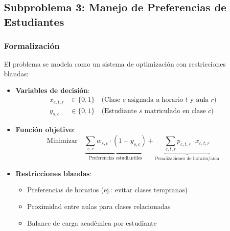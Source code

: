 \documentclass[12pt, a4paper]{article}
\begin{document}
\subsection{Subproblema 3: Manejo de Preferencias de Estudiantes}

\subsubsection*{Formalización}
El problema se modela como un sistema de optimización con restricciones blandas:

\begin{itemize}
    \item \textbf{Variables de decisión}:
    \begin{align*}
        x_{c,t,r} &\in \{0, 1\} \quad \text{(Clase $c$ asignada a horario $t$ y aula $r$)} \\
        y_{s,c} &\in \{0, 1\} \quad \text{(Estudiante $s$ matriculado en clase $c$)}
    \end{align*}
    
    \item \textbf{Función objetivo}:
    \[
    \text{Minimizar} \quad \underbrace{\sum_{s,c} w_{s,c} \cdot (1 - y_{s,c})}_{\text{Preferencias estudiantiles}} + \underbrace{\sum_{c,t,r} p_{c,t,r} \cdot x_{c,t,r}}_{\text{Penalizaciones de horario/aula}}
    \]
    
    \item \textbf{Restricciones blandas}:
    \begin{itemize}
        \item Preferencias de horarios (ej.: evitar clases tempranas)
        \item Proximidad entre aulas para clases relacionadas
        \item Balance de carga académica por estudiante
    \end{itemize}
\end{itemize}
\end{document}
